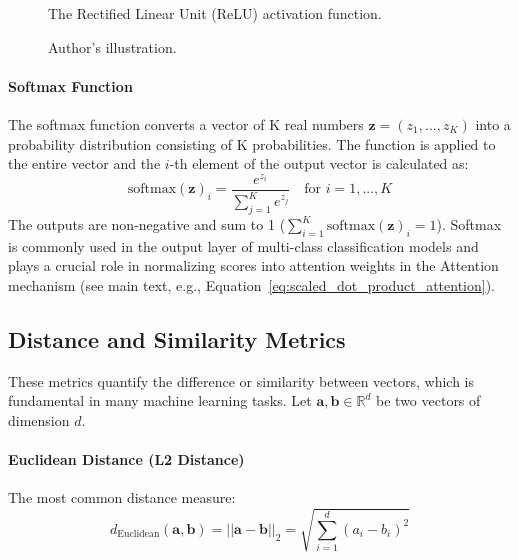 \begin{appendices}
  \begin{figure}[htbp]
    \centering
    \caption[ReLU activation function]{The Rectified Linear Unit (ReLU) activation function.}
    \label{fig:relu_plot}
    \caption*{Author's illustration.}
  \end{figure}


  \paragraph{Softmax Function}
  The softmax function converts a vector of K real numbers \( \bm{z} = (z_1, ..., z_K) \) into a probability distribution consisting of K probabilities. The function is applied to the entire vector and the $i$-th element of the output vector is calculated as:
  \begin{equation}
    \text{softmax}(\bm{z})_i = \frac{e^{z_i}}{\sum_{j=1}^K e^{z_j}} \quad \text{for } i = 1, ..., K
  \end{equation}
  The outputs are non-negative and sum to 1 (\( \sum_{i=1}^K \text{softmax}(\bm{z})_i = 1 \)). Softmax is commonly used in the output layer of multi-class classification models and plays a crucial role in normalizing scores into attention weights in the Attention mechanism (see main text, e.g., Equation~\ref{eq:scaled_dot_product_attention}).

  \subsection{Distance and Similarity Metrics}
  \label{subsec:distance_metrics}
  These metrics quantify the difference or similarity between vectors, which is fundamental in many machine learning tasks. Let \( \bm{a}, \bm{b} \in \mathbb{R}^d \) be two vectors of dimension $d$.

  \paragraph{Euclidean Distance (L2 Distance)}
  \label{eq:euclidean_distance}
  The most common distance measure:
  \begin{equation}
    d_{\text{Euclidean}}(\bm{a}, \bm{b}) = ||\bm{a} - \bm{b}||_2 = \sqrt{\sum_{i=1}^d (a_i - b_i)^2}
  \end{equation}


\end{appendices}
